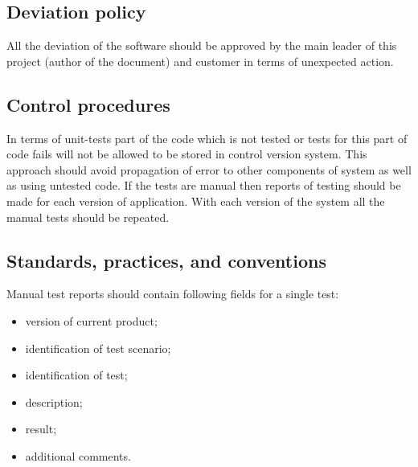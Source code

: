\subsection{Deviation policy} \label{s:details-of-the-master-test-plan:deviation-policy}
	\begin{comment}
		$<$ Describe the procedures and criteria used to deviate from the MTP and level test documentation after they are developed. The information required for deviations includes task identification, rationale, and effect on system/software quality. Identify the authorities responsible for approving deviations. $>$
	\end{comment}
	All the deviation of the software should be approved by the main leader of this project (author of the document) and customer in terms of unexpected action.
\subsection{Control procedures} \label{s:details-of-the-master-test-plan:control-procedures}
	\begin{comment}
		$<$ Identify control procedures applied to the test activities. These procedures describe how the softwarebased system and software products and test results will be configured, protected, and stored.\\
		These procedures may describe quality assurance, configuration management, data management, or other activities if they are not addressed by other efforts. Describe how the test activities comply with existing security provisions and how the test results are to be protected from unauthorized alterations. $>$
	\end{comment}
	In terms of unit-tests part of the code which is not tested or tests for this part of code fails will not be allowed to be stored in control version system. This approach should avoid propagation of error to other components of system as well as using untested code. If the tests are manual then reports of testing should be made for each version of application. With each version of the system all the manual tests should be repeated.
\subsection{Standards, practices, and conventions} \label{s:details-of-the-master-test-plan:standards-practices-and-conventions}
	\begin{comment}
		$<$ Identify the standards, practices, and conventions that govern the performance of testing tasks including, but not limited to, internal organizational standards, practices, and policies. $>$
	\end{comment}
	Manual test reports should contain following fields for a single test:
	\begin{itemize}
		\item version of current product;
		\item identification of test scenario;
		\item identification of test;
		\item description;
		\item result;
		\item additional comments.
	\end{itemize}
